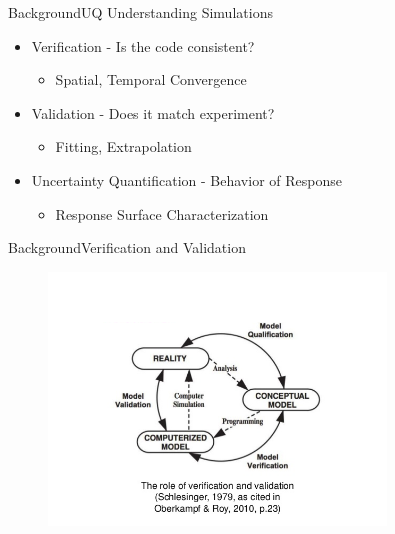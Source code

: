 \documentclass{beamer}
\begin{document}
\begin{frame}{Background}{UQ}\vspace{-20pt}
  Understanding Simulations
  \pause
  \begin{itemize}
    \item Verification - Is the code consistent?
      \begin{itemize}
        \item Spatial, Temporal Convergence
      \end{itemize}\vspace{10pt}
    \item Validation - Does it match experiment?
      \begin{itemize}
        \item Fitting, Extrapolation
      \end{itemize}\vspace{10pt}
    \item Uncertainty Quantification - Behavior of Response
      \begin{itemize}
        \item Response Surface Characterization
      \end{itemize}
  \end{itemize}
\end{frame}

\begin{frame}{Background}{Verification and Validation}
  \vspace{-50pt}
  \begin{figure}[h!]
    \centering
      \includegraphics[width=0.8\textwidth]{../../graphics/v_and_v_1}
  \end{figure}
\end{frame}
\end{document}

